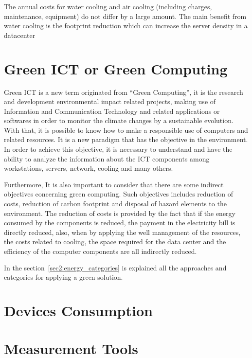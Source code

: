                 \begin{figure}[h!tb]
                    \centering
                    \label{tab:life_cycle_costs_water_cooled_air_cooled}
                \end{figure}
                The annual costs for water cooling and air cooling (including charges, maintenance, equipment) do not differ by a large amount. The main benefit from water cooling is the footprint reduction which can increase the server density in a datacenter%

\pagebreak%
\section{Green ICT or Green Computing} \label{sec2:green_ict}
    Green ICT is a new term originated from ``Green Computing'', it is the research and development environmental impact related projects, making use of Information and Communication Technology and related applications or softwares in order to monitor the climate changes by a sustainable evolution. With that, it is possible to know how to make a responsible use of computers and related resources. It is a new paradigm that has the objective in the environment. In order to achieve this objective, it is necessary to understand and have the ability to analyze the information about the ICT components among workstations, servers, network, cooling and many others. 
    
    Furthermore, It is also important to consider that there are some indirect objectives concerning green computing. Such objectives includes reduction of costs, reduction of carbon footprint and disposal of hazard elements to the environment. The reduction of costs is provided by the fact that if the energy consumed by the components is reduced, the payment in the electricity bill is directly reduced, also, when by applying the well management of the resources, the costs related to cooling, the space required for the data center and the efficiency of the computer components are all indirectly reduced.
    
    In the section~\ref{sec2:energy_categories} is explained all the approaches and categories for applying a green solution.
    

    
\section{Devices Consumption} \label{sec2:devices_consumption} 
    
\section{Measurement Tools} \label{sec2:tools}


